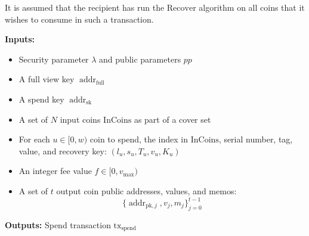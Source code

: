 \documentclass{llncs}
\newcommand{\addr}{\operatorname{addr}}
\begin{document}
It is assumed that the recipient has run the $\text{Recover}$ algorithm on all coins that it wishes to consume in such a transaction.

\textbf{Inputs:}
\begin{itemize}
    \item Security parameter $\lambda$ and public parameters $pp$
    \item A full view key $\addr_{\text{full}}$
    \item A spend key $\addr_{\text{sk}}$
    \item A set of $N$ input coins $\text{InCoins}$ as part of a cover set
    \item For each $u \in [0,w)$ coin to spend, the index in $\text{InCoins}$, serial number, tag, value, and recovery key: $(l_u, s_u, T_u, v_u, K_u)$
    \item An integer fee value $f \in [0,v_{\text{max}})$
    \item A set of $t$ output coin public addresses, values, and memos: $$\{\addr_{\text{pk},j}, v_j, m_j\}_{j=0}^{t-1}$$
\end{itemize}

\textbf{Outputs:} Spend transaction $\text{tx}_{\text{spend}}$
\end{document}
